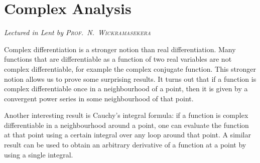 \chapter[Complex Analysis \\ \textnormal{\emph{Lectured in Lent \oldstylenums{2022} by \textsc{Prof.\ N.\ Wickramasekera}}}]{Complex Analysis}
\emph{\Large Lectured in Lent  by \textsc{Prof.\ N.\ Wickramasekera}}

Complex differentiation is a stronger notion than real differentiation.
Many functions that are differentiable as a function of two real variables are not complex differentiable, for example the complex conjugate function.
This stronger notion allows us to prove some surprising results.
It turns out that if a function is complex differentiable once in a neighbourhood of a point, then it is given by a convergent power series in some neighbourhood of that point.

Another interesting result is Cauchy's integral formula: if a function is complex differentiable in a neighbourhood around a point, one can evaluate the function at that point using a certain integral over any loop around that point.
A similar result can be used to obtain an arbitrary derivative of a function at a point by using a single integral.


